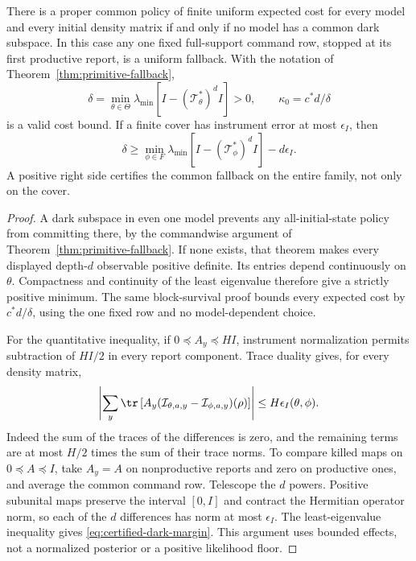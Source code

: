 \begin{lemma}\label{lem:compact-fallback}
There is a proper common policy of finite uniform expected cost for every model and every initial density matrix if and only if no model has a common dark subspace. In this case any one fixed full-support command row, stopped at its first productive report, is a uniform fallback. With the notation of Theorem~\ref{thm:primitive-fallback},
\[
 \delta=\min_{\theta\in\Theta}\lambda_{\min}
            [I-(\mathcal T_\theta^*)^dI]>0,\qquad
 \kappa_0=c^*d/\delta
\]
is a valid cost bound. If a finite cover has instrument error at most $\epsilon_I$, then
\begin{equation}\label{eq:certified-dark-margin}
 \delta\ge\min_{\phi\in F}\lambda_{\min}
           [I-(\mathcal T_\phi^*)^dI]-d\epsilon_I.
\end{equation}
A positive right side certifies the common fallback on the entire family, not only on the cover.
\end{lemma}
\begin{proof}
A dark subspace in even one model prevents any all-initial-state policy from committing there, by the commandwise argument of Theorem~\ref{thm:primitive-fallback}. If none exists, that theorem makes every displayed depth-$d$ observable positive definite. Its entries depend continuously on $\theta$. Compactness and continuity of the least eigenvalue therefore give a strictly positive minimum. The same block-survival proof bounds every expected cost by $c^*d/\delta$, using the one fixed row and no model-dependent choice.

For the quantitative inequality, if $0\preccurlyeq A_y\preccurlyeq HI$, instrument normalization permits subtraction of $HI/2$ in every report component. Trace duality gives, for every density matrix,
\begin{equation}\label{eq:effect-distance}
 \left|\sum_y\tr\left[A_y
   (\mathcal I_{\theta,a,y}-\mathcal I_{\phi,a,y})(\rho)\right]\right|
       \le H\epsilon_I(\theta,\phi).
\end{equation}
Indeed the sum of the traces of the differences is zero, and the remaining terms are at most $H/2$ times the sum of their trace norms. To compare killed maps on $0\preccurlyeq A\preccurlyeq I$, take $A_y=A$ on nonproductive reports and zero on productive ones, and average the common command row. Telescope the $d$ powers. Positive subunital maps preserve the interval $[0,I]$ and contract the Hermitian operator norm, so each of the $d$ differences has norm at most $\epsilon_I$. The least-eigenvalue inequality gives \eqref{eq:certified-dark-margin}. This argument uses bounded effects, not a normalized posterior or a positive likelihood floor.
\end{proof}

